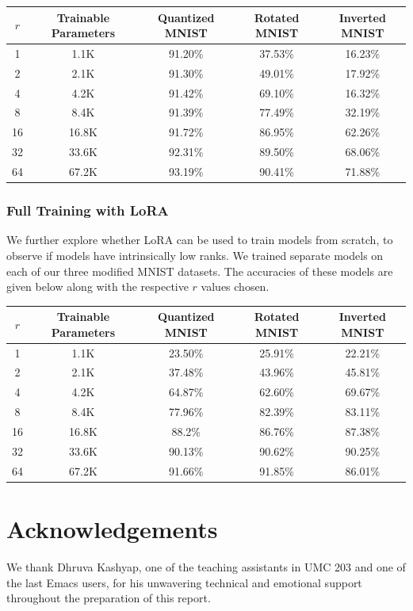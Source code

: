 \documentclass{article}
\newcommand\Tstrut{\rule{0pt}{2.6ex}}
\begin{document}
\begin{center}
    \begin{tabular}{c | c | c | c | c}
        $r$ & Trainable Parameters & Quantized MNIST & Rotated MNIST & Inverted MNIST \\
        \hline
        1 & 1.1K & 91.20\% & 37.53\% & 16.23\% \Tstrut \\
        2 & 2.1K & 91.30\% & 49.01\% & 17.92\% \\
        4 & 4.2K & 91.42\% & 69.10\% & 16.32\% \\
        8 & 8.4K & 91.39\% & 77.49\% & 32.19\% \\
        16 & 16.8K & 91.72\% & 86.95\% & 62.26\% \\
        32 & 33.6K & 92.31\% & 89.50\% & 68.06\% \\
        64 & 67.2K & 93.19\% & 90.41\% & 71.88\%
    \end{tabular}
\end{center}

\subsubsection{Full Training with LoRA}
We further explore whether LoRA can be used to train models from scratch, to observe if models have intrinsically low ranks. We trained separate models on each of our three modified MNIST datasets. The accuracies of these models are given below along with the respective $r$ values chosen.

\begin{center}
    \begin{tabular}{c | c | c | c | c}
        $r$ & Trainable Parameters & Quantized MNIST & Rotated MNIST & Inverted MNIST \\
        \hline
        1 & 1.1K & 23.50\% & 25.91\% & 22.21\% \Tstrut \\
        2 & 2.1K & 37.48\% & 43.96\% & 45.81\% \\
        4 & 4.2K & 64.87\% & 62.60\% & 69.67\% \\
        8 & 8.4K & 77.96\% & 82.39\% & 83.11\% \\
        16 & 16.8K & 88.2\% & 86.76\% & 87.38\% \\
        32 & 33.6K & 90.13\% & 90.62\% & 90.25\% \\
        64 & 67.2K & 91.66\% & 91.85\% & 86.01\%
    \end{tabular}
\end{center}

\section{Acknowledgements}
We thank Dhruva Kashyap, one of the teaching assistants in UMC 203 and one of the last Emacs users, for his unwavering technical and emotional support throughout the preparation of this report.

\end{document}
